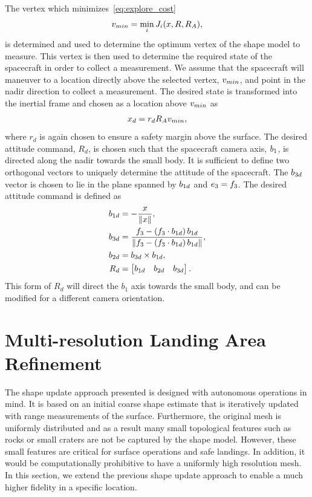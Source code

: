 \documentclass[journal]{new-aiaa}
\begin{document}
The vertex which minimizes~\cref{eq:explore_cost} 
\begin{align*}
    v_{min} = \min_{i} J_i(x, R, R_A),
\end{align*}
is determined and used to determine the optimum vertex of the shape model to measure.
This vertex is then used to determine the required state of the spacecraft in order to collect a measurement.
We assume that the spacecraft will maneuver to a location directly above the selected vertex, \( v_{min} \), and point in the nadir direction to collect a measurement.
The desired state is transformed into the inertial frame and chosen as a location above \( v_{min} \) as
\begin{align}
    x_d = r_d R_A v_{min}, 
\end{align}
where \( r_d \) is again chosen to ensure a safety margin above the surface.
The desired attitude command, \( R_d\), is chosen such that the spacecraft camera axis, \( b_1 \), is directed along the nadir towards the small body.
It is sufficient to define two orthogonal vectors to uniquely determine the attitude of the spacecraft.
The \( b_{3d} \) vector is chosen to lie in the plane spanned by \(b_{1d} \) and \( e_3 = f_3 \).
The desired attitude command is defined as
\begin{align}
    b_{1d} &= - \frac{x}{\left\| x \right\|} , \\
    b_{3d} &= \frac{f_3 - \left( f_3 \cdot b_{1d} \right) b_{1d}}{\left\| f_3 - \left( f_3 \cdot b_{1d} \right) b_{1d} \right\|}, \\
    b_{2d} &= b_{3d} \times b_{1d} , \\
    R_d &= \begin{bmatrix} b_{1d} & b_{2d} & b_{3d} \end{bmatrix} .
\end{align}
This form of \( R_d \) will direct the \( b_1 \) axis towards the small body, and can be modified for a different camera orientation.


\section{Multi-resolution Landing Area Refinement}\label{sec:landing_refinement}

The shape update approach presented is designed with autonomous operations in mind. 
It is based on an initial coarse shape estimate that is iteratively updated with range measurements of the surface.
Furthermore, the original mesh is uniformly distributed and as a result many small topological features such as rocks or small craters are not be captured by the shape model. 
However, these small features are critical for surface operations and safe landings.
In addition, it would be computationally prohibitive to have a uniformly high resolution mesh.
In this section, we extend the previous shape update approach to enable a much higher fidelity in a specific location.
\end{document}
